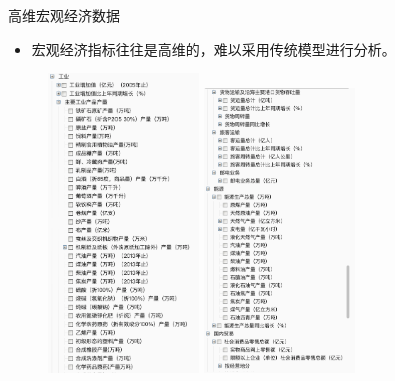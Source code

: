 \begin{frame}{高维宏观经济数据}
  \begin{itemize}
    \item
    宏观经济指标往往是高维的，难以采用传统模型进行分析。
  \end{itemize}
  \begin{figure}[H]
    \includegraphics[width=4cm]{pics/var1.png}
    \includegraphics[width=4cm]{pics/var2.png}
  \end{figure}
  
\end{frame}